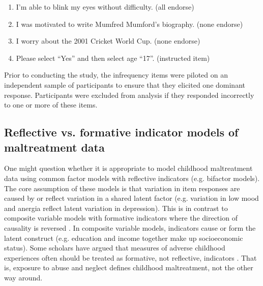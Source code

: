 \documentclass[letterpaper,man,natbib,noextraspace,floatsintext,longtable]{apa6}
\begin{document}
\begin{enumerate}
    \item I'm able to blink my eyes without difficulty. (all endorse)
    \item I was motivated to write Mumfred Mumford's biography. (none endorse)
    \item I worry about the 2001 Cricket World Cup. (none endorse)
    \item Please select ``Yes'' and then select age ``17''. (instructed item)
\end{enumerate}

\noindent Prior to conducting the study, the infrequency items were piloted on an independent sample of participants to ensure that they elicited one dominant response. Participants were excluded from analysis if they responded incorrectly to one or more of these items.

\break
\subsection*{Reflective vs. formative indicator models of maltreatment data}

One might question whether it is appropriate to model childhood maltreatment data using common factor models with reflective indicators (e.g. bifactor models). The core assumption of these models is that variation in item responses are caused by or reflect variation in a shared latent factor (e.g. variation in low mood and anergia reflect latent variation in depression). This is in contrast to composite variable models with formative indicators where the direction of causality is reversed . In composite variable models, indicators cause or form the latent construct (e.g. education and income together make up socioeconomic status). Some scholars have argued that measures of adverse childhood experiences often should be treated as formative, not reflective, indicators . That is, exposure to abuse and neglect defines childhood maltreatment, not the other way around. 
\end{document}
